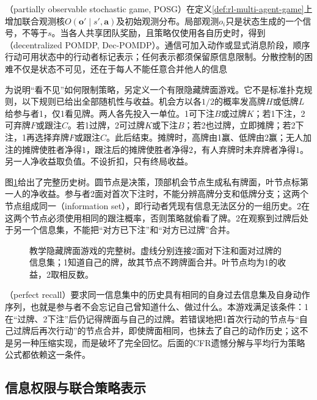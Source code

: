 （partially observable stochastic game, POSG）在定义\ref{def:rl-multi-agent-game}上增加联合观测核$O(\bm o'\mid s',\bm a)$及初始观测分布。局部观测$o_i$只是状态生成的一个信号，不等于$s$。当各人共享团队奖励，且策略仅使用各自历史时，得到（decentralized POMDP, Dec-POMDP）。通信可加入动作或显式消息阶段，顺序行动可用状态中的行动者标记表示；任何表示都须保留原信息限制。分散控制的困难不仅是状态不可见，还在于每人不能任意合并他人的信息

为说明“看不见”如何限制策略，另定义一个有限隐藏牌面游戏。它不是标准扑克规则，以下规则已给出全部随机性与收益。机会方以各$1/2$的概率发高牌$H$或低牌$L$给参与者1，仅1看见牌。两人各先投入一单位。1可下注$B$或过牌$K$；若1下注，2可弃牌$F$或跟注$C$。若1过牌，2可过牌$K$或下注$B$；若2也过牌，立即摊牌；若2下注，1再选择弃牌$F$或跟注$C$。此后结束。摊牌时，高牌由1赢、低牌由2赢；无人加注的摊牌使胜者净得$1$，跟注后的摊牌使胜者净得$2$，有人弃牌时未弃牌者净得$1$。另一人净收益取负值。不设折扣，只有终局收益。

图\ref{fig:rl-multi-agent-card-tree}给出了完整历史树。圆节点是决策，顶部机会节点生成私有牌面，叶节点标第一人的净收益。参与者2面对首次下注时，不能分辨高牌分支和低牌分支；这两个节点组成同一（information set），即行动者凭现有信息无法区分的一组历史。2在这两个节点必须使用相同的跟注概率，否则策略就偷看了牌。2在观察到过牌后处于另一个信息集，不能把“对方已下注”和“对方已过牌”合并。

\begin{figure}[htbp]
 \centering
 
 \caption{教学隐藏牌面游戏的完整树。虚线分别连接2面对下注和面对过牌的信息集；1知道自己的牌，故其节点不跨牌面合并。叶节点均为1的收益，2取相反数。}
 \label{fig:rl-multi-agent-card-tree}
\end{figure}

（perfect recall）要求同一信息集中的历史具有相同的自身过去信息集及自身动作序列，也就是参与者不会忘记自己曾知道什么、做过什么。本游戏满足该条件：1在“过牌、2下注”后仍记得牌面与自己的过牌。若错误地把1首次行动的节点与“自己过牌后再次行动”的节点合并，即使牌面相同，也抹去了自己的动作历史；这不是另一种压缩实现，而是破坏了完全回忆。后面的CFR遗憾分解与平均行为策略公式都依赖这一条件。

\subsection{信息权限与联合策略表示}
\label{sec:rl-multi-agent-permissions}

